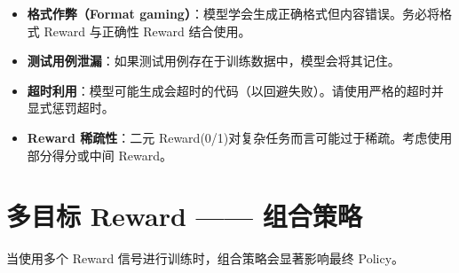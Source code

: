 \begin{warningbox}
\begin{itemize}
  \item \textbf{格式作弊（Format gaming）}：模型学会生成正确格式但内容错误。务必将格式 Reward 与正确性 Reward 结合使用。
  \item \textbf{测试用例泄漏}：如果测试用例存在于训练数据中，模型会将其记住。
  \item \textbf{超时利用}：模型可能生成会超时的代码（以回避失败）。请使用严格的超时并显式惩罚超时。
  \item \textbf{Reward 稀疏性}：二元 Reward(0/1)对复杂任务而言可能过于稀疏。考虑使用部分得分或中间 Reward。
\end{itemize}
\end{warningbox}

\section{多目标 Reward —— 组合策略}
\label{sec:multi-objective-rewards}

当使用多个 Reward 信号进行训练时，组合策略会显著影响最终 Policy。

